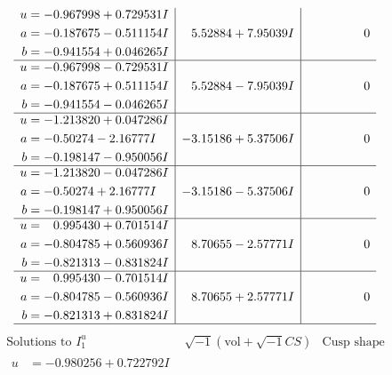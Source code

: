 \documentclass[1p]{elsarticle_modified}
\theoremstyle{definition}
\newcommand{\I}{\sqrt{-1}}
\begin{document}
$$\begin{array}{c|c|c}
\begin{aligned}
u &= -0.967998 + 0.729531 I \\
a &= -0.187675 - 0.511154 I \\
b &= -0.941554 + 0.046265 I\end{aligned}
 & \phantom{-}5.52884 + 7.95039 I & \phantom{-0.000000 } 0 \\ \hline\begin{aligned}
u &= -0.967998 - 0.729531 I \\
a &= -0.187675 + 0.511154 I \\
b &= -0.941554 - 0.046265 I\end{aligned}
 & \phantom{-}5.52884 - 7.95039 I & \phantom{-0.000000 } 0 \\ \hline\begin{aligned}
u &= -1.213820 + 0.047286 I \\
a &= -0.50274 - 2.16777 I \\
b &= -0.198147 - 0.950056 I\end{aligned}
 & -3.15186 + 5.37506 I & \phantom{-0.000000 } 0 \\ \hline\begin{aligned}
u &= -1.213820 - 0.047286 I \\
a &= -0.50274 + 2.16777 I \\
b &= -0.198147 + 0.950056 I\end{aligned}
 & -3.15186 - 5.37506 I & \phantom{-0.000000 } 0 \\ \hline\begin{aligned}
u &= \phantom{-}0.995430 + 0.701514 I \\
a &= -0.804785 + 0.560936 I \\
b &= -0.821313 - 0.831824 I\end{aligned}
 & \phantom{-}8.70655 - 2.57771 I & \phantom{-0.000000 } 0 \\ \hline\begin{aligned}
u &= \phantom{-}0.995430 - 0.701514 I \\
a &= -0.804785 - 0.560936 I \\
b &= -0.821313 + 0.831824 I\end{aligned}
 & \phantom{-}8.70655 + 2.57771 I & \phantom{-0.000000 } 0\\
 \hline 
 \end{array}$$\newpage$$\begin{array}{c|c|c}  
\text{Solutions to }I^u_{1}& \I (\text{vol} + \sqrt{-1}CS) & \text{Cusp shape}\\
 \hline 
\begin{aligned}
u &= -0.980256 + 0.722792 I \\

\end{aligned}
\end{array}$$
\end{document}
